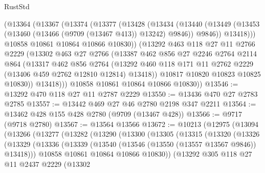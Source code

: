 \begin{lexlean}{RustStd}
\begin{coremodule}
          (@13364
            (@13367
              (@13374
                (@13377
                  (@13428
                    (@13434
                      (@13440
                        (@13449
                          (@13453 (@13460 (@13466 (@9709 (@13467 @413)) @13242) @9846))
                          @9846))
                      @13418)))
                @10858
                @10861
                @10864
                @10866
                @10830))
            (@13292
              @463
              @118
              @27
              @11
              @2766
              @2229
              (@13302
                @463
                @27
                @2766
                (@13387
                  @462
                  @856
                  @27
                  @2246
                  @2764
                  @2114
                  @864
                  (@13317
                    @462
                    @856
                    @2764
                    (@13292
                      @460
                      @118
                      @171
                      @11
                      @2762
                      @2229
                      (@13406 @459 @2762 @12810 @12814)
                      @13418))
                  @10817
                  @10820
                  @10823
                  @10825
                  @10830))
              @13418)))
        @10858
        @10861
        @10864
        @10866
        @10830))
@13546 := @13292 @470 @118 @27 @11 @2787 @2229
@13550 := @13436 @470 @27 @2783 @2785
@13557 := @13442 @469 @27 @46 @2780 @2198 @347 @2211
@13564 := @13462 @428 @155 @428 @2780 (@9709 (@13467 @428))
@13566 := @9717 (@9718 @2780)
@13567 := @13564 @13566
@13672 := @10213
    (@12975
      (@13094
        (@13266
          (@13277
            (@13282
              (@13290
                (@13300
                  (@13305
                    (@13315
                      (@13320
                        (@13326
                          (@13329
                            (@13336
                              (@13339 (@13540 (@13546 (@13550 (@13557 @13567 @9846)) @13418)))
                              @10858
                              @10861
                              @10864
                              @10866
                              @10830))
                          (@13292
                            @305
                            @118
                            @27
                            @11
                            @2437
                            @2229
                            (@13302

\end{coremodule}
\end{lexlean}
